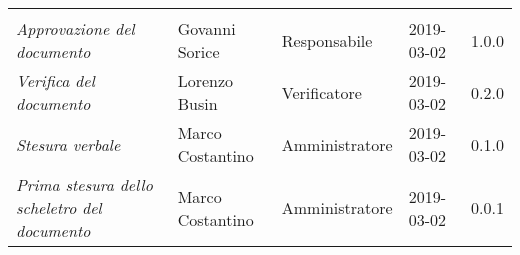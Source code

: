 \newpage 
\section*{}
\begin{table}[H]
	\centering
	\begin{tabular}{p{4cm}|C{3cm}|C{3cm}|R{2.5cm}|R{2cm}}
		
		 & & & & \\
		
		
		\emph{Approvazione del documento} & Govanni Sorice & Responsabile & 2019-03-02 & 1.0.0 \\
		\hline
		
		\emph{Verifica del documento} & Lorenzo Busin & Verificatore & 2019-03-02 & 0.2.0 \\
		\hline
		
		\emph{Stesura verbale} & Marco Costantino & Amministratore & 2019-03-02 & 0.1.0 \\
		\hline
		
		\emph{Prima stesura dello scheletro del documento} & Marco Costantino & Amministratore & 2019-03-02 & 0.0.1 \\
		
	\end{tabular}
	
\end{table}


\clearpage